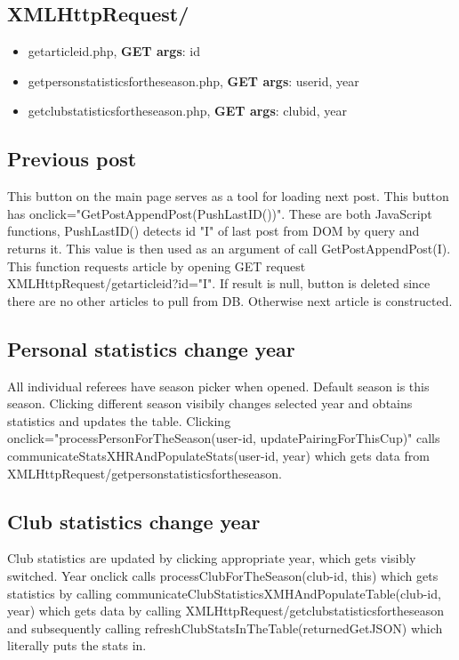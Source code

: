 \subsection*{XMLHttpRequest/}
\begin{itemize}
    \item getarticleid.php, \textbf{GET args}: id
    \item getpersonstatisticsfortheseason.php, \textbf{GET args}: user\textunderscore id, year
    \item getclubstatisticsfortheseason.php, \textbf{GET args}: club\textunderscore id, year
\end{itemize}
\subsection{Previous post}
This button on the main page serves as a tool for loading next post. This button has onclick="GetPostAppendPost(PushLastID())". These are both JavaScript functions, PushLastID() detects id "I" of last post from DOM by query and returns it. This value is then used as an argument of call GetPostAppendPost(I). This function requests article by opening GET request XMLHttpRequest/getarticleid?id="I". If result is null, button is deleted since there are no other articles to pull from DB. Otherwise next article is constructed.
\subsection{Personal statistics change year}
All individual referees have season picker when opened. Default season is this season. Clicking different season visibily changes selected year and obtains statistics and updates the table. Clicking onclick="processPersonForTheSeason(user-id, updatePairingForThisCup)" calls communicateStatsXHRAndPopulateStats(user-id, year) which gets data from XMLHttpRequest/getpersonstatisticsfortheseason. 
\subsection{Club statistics change year}
Club statistics are updated by clicking appropriate year, which gets visibly switched. Year onclick calls processClubForTheSeason(club-id, this) which gets statistics by calling communicateClubStatisticsXMHAndPopulateTable(club-id, year) which gets data by calling XMLHttpRequest/getclubstatisticsfortheseason and subsequently calling refreshClubStatsInTheTable(returnedGetJSON) which literally puts the stats in.
